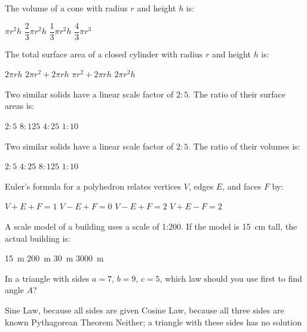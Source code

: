 \documentclass[addpoints]{exam}
\begin{document}
\begin{questions}
\question[1]
The volume of a cone with radius $r$ and height $h$ is:
\begin{choices}
    \choice $\pi r^2 h$
    \choice $\dfrac{2}{3}\pi r^2 h$
    \correctchoice $\dfrac{1}{3}\pi r^2 h$
    \choice $\dfrac{4}{3}\pi r^3$
\end{choices}
\vspace{3mm}

\question[1]
The total surface area of a closed cylinder with radius $r$ and height $h$ is:
\begin{choices}
    \choice $2\pi r h$
    \correctchoice $2\pi r^2 + 2\pi r h$
    \choice $\pi r^2 + 2\pi r h$
    \choice $2\pi r^2 h$
\end{choices}
\vspace{3mm}

\question[1]
Two similar solids have a linear scale factor of $2:5$. The ratio of their surface areas is:
\begin{choices}
    \choice $2:5$
    \choice $8:125$
    \correctchoice $4:25$
    \choice $1:10$
\end{choices}
\vspace{3mm}

\question[1]
Two similar solids have a linear scale factor of $2:5$. The ratio of their volumes is:
\begin{choices}
    \choice $2:5$
    \choice $4:25$
    \correctchoice $8:125$
    \choice $1:10$
\end{choices}
\vspace{3mm}

\question[1]
Euler's formula for a polyhedron relates vertices $V$, edges $E$, and faces $F$ by:
\begin{choices}
    \choice $V + E + F = 1$
    \choice $V - E + F = 0$
    \correctchoice $V - E + F = 2$
    \choice $V + E - F = 2$
\end{choices}
\vspace{3mm}

\question[1]
A scale model of a building uses a scale of 1:200. If the model is \SI{15}{cm} tall, the actual building is:
\begin{choices}
    \choice \SI{15}{m}
    \choice \SI{200}{m}
    \correctchoice \SI{30}{m}
    \choice \SI{3000}{m}
\end{choices}
\vspace{3mm}

\question[1]
In a triangle with sides $a = 7$, $b = 9$, $c = 5$, which law should you use first to find angle $A$?
\begin{choices}
    \choice Sine Law, because all sides are given
    \correctchoice Cosine Law, because all three sides are known
    \choice Pythagorean Theorem
    \choice Neither; a triangle with these sides has no solution
\end{choices}
\vspace{3mm}


\end{questions}
\end{document}
